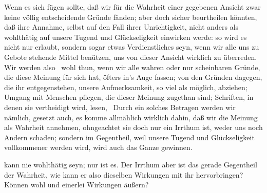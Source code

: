 \begin{aufza}
\item Wenn es sich fügen sollte, daß wir für die Wahrheit einer gegebenen Ansicht zwar keine völlig entscheidende Gründe fänden; aber doch sicher beurtheilen könnten, daß ihre Annahme, selbst auf den Fall ihrer Unrichtigkeit, nicht anders als wohlthätig auf unsere Tugend und Glückseligkeit einwirken werde: so wird es nicht nur erlaubt, sondern sogar etwas Verdienstliches seyn, wenn wir alle uns zu Gebote stehende Mittel benützen, uns von dieser Ansicht wirklich zu überreden. Wir werden also \zB\ wohl thun, wenn wir alle wahren oder nur scheinbaren Gründe, die diese Meinung für sich hat, öfters in's Auge fassen; von den Gründen dagegen, die ihr entgegenstehen, unsere Aufmerksamkeit, so viel als möglich, abziehen; Umgang mit Menschen pflegen, die dieser Meinung zugethan sind; Schriften, in denen sie vertheidigt wird, lesen, \usw\ Durch ein solches Betragen werden wir nämlich, gesetzt auch, es komme allmählich wirklich dahin, daß wir die Meinung als Wahrheit annehmen, ohngeachtet sie doch nur ein Irrthum ist, weder uns noch Andern schaden; sondern im Gegentheil, weil unsere Tugend und Glückseligkeit vollkommener werden wird, wird auch das Ganze gewinnen.
\end{aufza}\par
{}  kann nie wohlthätig seyn; nur  ist es. Der Irrthum aber ist das gerade Gegentheil der Wahrheit, wie kann er also dieselben Wirkungen mit ihr hervorbringen? Können wohl  und  einerlei Wirkungen äußern?\par
{}
